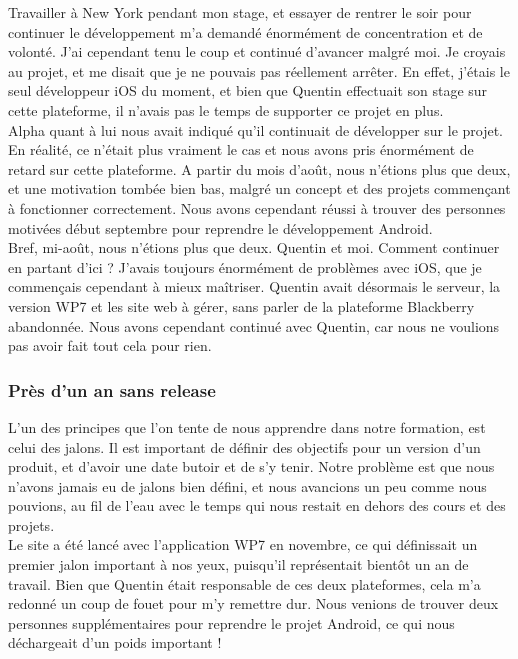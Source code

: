 \documentclass{article}
\begin{document}
		Travailler à New York pendant mon stage, et essayer de rentrer le soir pour continuer le développement m'a demandé énormément de concentration et de volonté. J'ai cependant tenu le coup et continué d'avancer malgré moi. Je croyais au projet, et me disait que je ne pouvais pas réellement arrêter. En effet, j'étais le seul développeur iOS du moment, et bien que Quentin effectuait son stage sur cette plateforme, il n'avais pas le temps de supporter ce projet en plus. \\
	
		Alpha quant  à lui nous avait indiqué qu'il continuait de développer sur le projet. En réalité, ce n'était plus vraiment le cas et nous avons pris énormément de retard sur cette plateforme. A partir du mois d'août, nous n'étions plus que deux, et une motivation tombée bien bas, malgré un concept et des projets commençant à fonctionner correctement. Nous avons cependant réussi à trouver des personnes motivées début septembre pour reprendre le développement Android. \\
	
		Bref, mi-août, nous n'étions plus que deux. Quentin et moi. Comment continuer en partant d'ici ? J'avais toujours énormément de problèmes avec iOS, que je commençais cependant à mieux maîtriser. Quentin avait désormais le serveur, la version WP7 et les site web à gérer, sans parler de la plateforme Blackberry abandonnée. Nous avons cependant continué avec Quentin, car nous ne voulions pas avoir fait tout cela pour rien.

		\subsubsection{Près d'un an sans release}
		L'un des principes que l'on tente de nous apprendre dans notre formation, est celui des jalons. Il est important de définir des objectifs pour un version d'un produit, et d'avoir une date butoir et de s'y tenir. Notre problème est que nous n'avons jamais eu de jalons bien défini, et nous avancions un peu comme nous pouvions, au fil de l'eau avec le temps qui nous restait en dehors des cours et des projets.  \\
		
		Le site a été lancé avec l'application WP7 en novembre, ce qui définissait un premier jalon important à nos yeux, puisqu'il représentait bientôt un an de travail. Bien que Quentin était responsable de ces deux plateformes, cela m'a redonné un coup de fouet pour m'y remettre dur. Nous venions de trouver deux personnes supplémentaires pour reprendre le projet Android, ce qui nous déchargeait d'un poids important !\\
		
\end{document}

